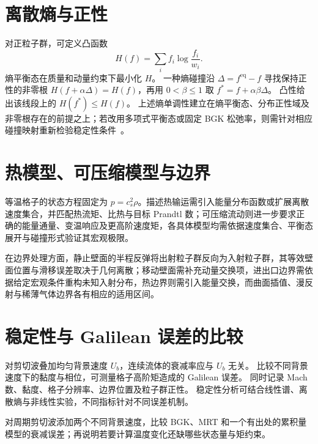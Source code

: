 \section{离散熵与正性}
对正粒子群，可定义凸函数
\[
H(f)=\sum_i f_i\log\frac{f_i}{w_i}.
\]
熵平衡态在质量和动量约束下最小化 $H$。
一种熵碰撞沿 $\Delta=f^{\mathrm{eq}}-f$ 寻找保持正性的非零根
$H(f+\alpha\Delta)=H(f)$，再用 $0<\beta\le1$ 取
$f^*=f+\alpha\beta\Delta$。
凸性给出该线段上的 $H(f^*)\le H(f)$。
上述熵单调性建立在熵平衡态、分布正性域及非零根存在的前提之上；若改用多项式平衡态或固定 BGK 松弛率，则需针对相应碰撞映射重新检验稳定性条件~\cite{karlin1999}。

\section{热模型、可压缩模型与边界}
等温格子的状态方程固定为 $p=c_s^2\rho$。描述热输运需引入能量分布函数或扩展离散速度集合，并匹配热流矩、比热与目标 Prandtl 数；可压缩流动则进一步要求正确的能量通量、变温响应及更高阶速度矩，各具体模型均需依据速度集合、平衡态展开与碰撞形式验证其宏观极限。

在边界处理方面，静止壁面的半程反弹将出射粒子群反向为入射粒子群，其等效壁面位置与滑移误差取决于几何离散；移动壁面需补充动量交换项，进出口边界需依据给定宏观条件重构未知入射分布，热边界则需引入能量交换，而曲面插值、漫反射与稀薄气体边界各有相应的适用区间。

\section{稳定性与 Galilean 误差的比较}
对剪切波叠加均匀背景速度 $U_b$，连续流体的衰减率应与 $U_b$ 无关。
比较不同背景速度下的黏度与相位，可测量格子高阶矩造成的 Galilean 误差。
同时记录 Mach 数、黏度、格子分辨率、边界位置及粒子群正性。
稳定性分析可结合线性谱、离散熵与非线性实验，不同指标针对不同误差机制。

{对周期剪切波添加两个不同背景速度，比较 BGK、MRT 和一个有出处的累积量模型的衰减误差；再说明若要计算温度变化还缺哪些状态量与矩约束。}
